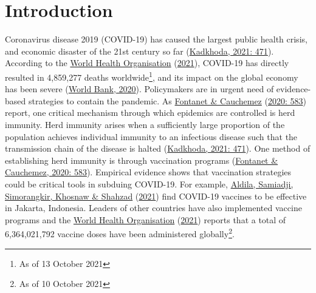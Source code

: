 \documentclass[11pt,preprint, authoryear]{elsarticle}
\numberwithin{equation}{section}
\numberwithin{figure}{section}
\numberwithin{table}{section}
\let\rmarkdownfootnote\footnote%
\def\footnote{\protect\rmarkdownfootnote}
\begin{document}
\renewcommand{\contentsname}{Table of Contents}
{\tableofcontents}

\pagestyle{fancy}
\chead{}
\rhead{}
\lfoot{}
\lhead{}
\cfoot{}


\headsep 35pt %




\newpage

\hypertarget{introduction}{%
\section{\texorpdfstring{Introduction
\label{Introduction}}{Introduction }}\label{introduction}}

Coronavirus disease 2019 (COVID-19) has caused the largest public health
crisis, and economic disaster of the 21st century so far
(\protect\hyperlink{ref-bad}{Kadkhoda, 2021: 471}). According to the
\protect\hyperlink{ref-who}{World Health Organisation}
(\protect\hyperlink{ref-who}{2021}), COVID-19 has directly resulted in
4,859,277 deaths worldwide\footnote{As of 13 October 2021}, and its
impact on the global economy has been severe
(\protect\hyperlink{ref-bank}{World Bank, 2020}). Policymakers are in
urgent need of evidence-based strategies to contain the pandemic. As
\protect\hyperlink{ref-immun}{Fontanet \& Cauchemez}
(\protect\hyperlink{ref-immun}{2020: 583}) report, one critical
mechanism through which epidemics are controlled is herd immunity. Herd
immunity arises when a sufficiently large proportion of the population
achieves individual immunity to an infectious disease such that the
transmission chain of the disease is halted
(\protect\hyperlink{ref-bad}{Kadkhoda, 2021: 471}). One method of
establishing herd immunity is through vaccination programs
(\protect\hyperlink{ref-immun}{Fontanet \& Cauchemez, 2020: 583}).
Empirical evidence shows that vaccination strategies could be critical
tools in subduing COVID-19. For example,
\protect\hyperlink{ref-erad}{Aldila, Samiadji, Simorangkir, Khosnaw \&
Shahzad} (\protect\hyperlink{ref-erad}{2021}) find COVID-19 vaccines to
be effective in Jakarta, Indonesia. Leaders of other countries have also
implemented vaccine programs and the \protect\hyperlink{ref-who}{World
Health Organisation} (\protect\hyperlink{ref-who}{2021}) reports that a
total of 6,364,021,792 vaccine doses have been administered
globally\footnote{As of 10 October 2021}.
\end{document}
